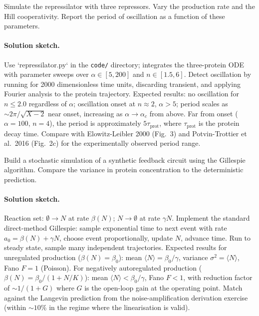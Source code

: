 \begin{exercise}
Simulate the repressilator with three repressors. Vary the
production rate and the Hill cooperativity. Report the period of
oscillation as a function of these parameters.

\paragraph{Solution sketch.}
Use `repressilator.py` in the \texttt{code/} directory; integrates the
three-protein ODE with parameter sweeps over
$\alpha \in [5, 200]$ and $n \in [1.5, 6]$. Detect oscillation by
running for 2000 dimensionless time units, discarding transient,
and applying Fourier analysis to the protein trajectory. Expected
results: no oscillation for $n \le 2.0$ regardless of $\alpha$;
oscillation onset at $n \approx 2$, $\alpha > 5$; period scales as
$\sim 2\pi/\sqrt{X-2}$ near onset, increasing as
$\alpha \to \alpha_{c}$ from above. Far from onset
($\alpha = 100$, $n = 4$), the period is approximately
$5\tau_{\text{prot}}$, where $\tau_{\text{prot}}$ is the protein
decay time. Compare with Elowitz-Leibler 2000 (Fig.~3) and
Potvin-Trottier et al.\ 2016 (Fig.~2c) for the
experimentally observed period range.
\end{exercise}

\begin{exercise}
Build a stochastic simulation of a synthetic feedback circuit using
the Gillespie algorithm. Compare the variance in protein
concentration to the deterministic prediction.

\paragraph{Solution sketch.}
Reaction set: $\emptyset \to N$ at rate $\beta(N)$; $N \to \emptyset$
at rate $\gamma N$. Implement the standard direct-method Gillespie:
sample exponential time to next event with rate
$a_{0} = \beta(N) + \gamma N$, choose event proportionally, update
$N$, advance time. Run to steady state, sample many independent
trajectories. Expected results for unregulated production
($\beta(N) = \beta_{0}$): mean $\langle N\rangle = \beta_{0}/\gamma$,
variance $\sigma^{2} = \langle N\rangle$, Fano $F = 1$ (Poisson).
For negatively autoregulated production
($\beta(N) = \beta_{0}/(1+N/K)$): mean
$\langle N\rangle < \beta_{0}/\gamma$, Fano $F < 1$, with reduction
factor of $\sim 1/(1+G)$ where $G$ is the open-loop gain at the
operating point. Match against the Langevin prediction from the noise-amplification
derivation exercise (within $\sim 10\%$ in the regime where the
linearisation is valid).
\end{exercise}

